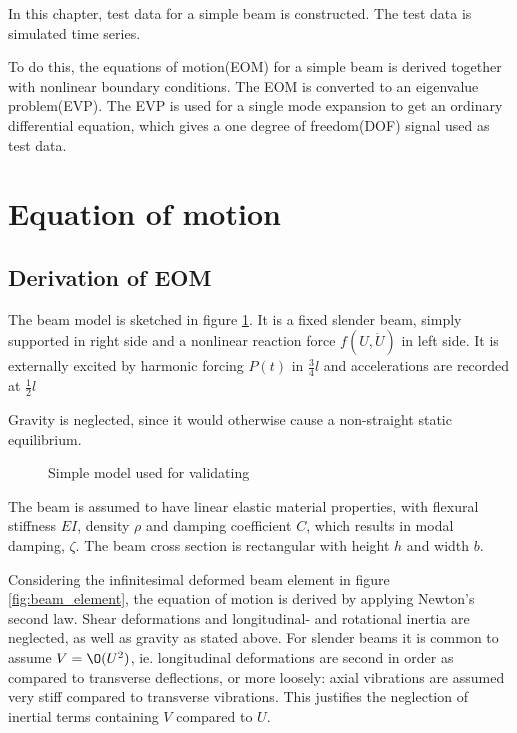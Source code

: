 
In this chapter, test data for a simple beam is constructed. The test
data is simulated time series.

To do this, the equations of motion(EOM) for a simple beam is derived together
with nonlinear boundary conditions.
The EOM is converted to an eigenvalue problem(EVP). The EVP is used for a
single mode expansion to get an ordinary differential equation, which gives a
one degree of freedom(DOF) signal used as test data.

\section{Equation of motion}
\label{sec:eom}


\subsection{Derivation of EOM}


The beam model is sketched in figure \ref{fig:eom_model}. It is a fixed slender
beam, simply supported in right side and a nonlinear reaction force $f(U,\dot
U)$ in left side. It is externally excited by harmonic forcing $P(t)$ in
$\tfrac{3}{4}l$ and accelerations are recorded at $\tfrac{1}{2}l$

Gravity is neglected, since it would otherwise cause a non-straight static
equilibrium.

\begin{figure}[!ht]
  \centering
  \resizebox{0.80\textwidth}{!}{}
  \caption{Simple model used for validating}
\label{fig:eom_model}
\end{figure}

The beam is assumed to have linear elastic material properties, with flexural
stiffness $EI$, density $\rho$ and damping coefficient $C$, which results in
modal damping, $\zeta$. The beam cross section is rectangular with height $h$
and width $b$.


Considering the infinitesimal deformed beam element in figure
\ref{fig:beam_element}, the equation of motion is derived by applying Newton's
second law. Shear deformations and longitudinal- and rotational inertia are
neglected, as well as gravity as stated above.
For slender beams it is common to assume $V = \O(U^2)$, ie. longitudinal
deformations are second in order as compared to transverse deflections, or more
loosely: axial vibrations are assumed very stiff compared to transverse
vibrations. This justifies the neglection of inertial terms containing $V$
compared to $U$.

